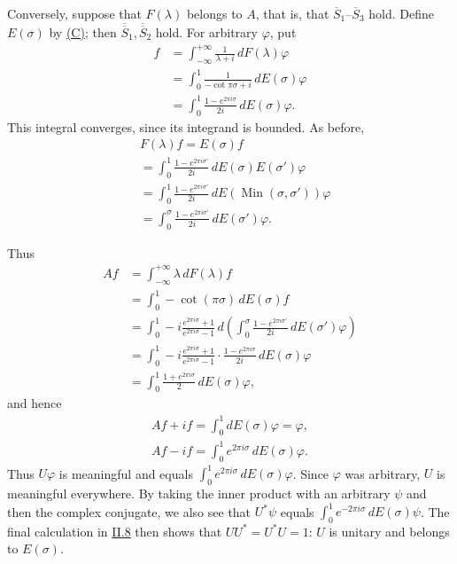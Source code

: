 \documentclass[fontsize=13pt,twoside,openany,headings=normal,parskip=false,bookmarkpackage=false,DIV=calc]{scrbook}
\begin{document}
Conversely, suppose that $F(\lambda)$ belongs to $A$, that is, that $\hyperref[cond:II.Sbar1]{\overline S_1}$--$\hyperref[cond:II.Sbar3]{\overline S_3}$ hold. Define $E(\sigma)$ by \hyperref[eq:II.9.C]{(C)}; then $\hyperref[cond:II.Sdouble1]{\overline{\overline S}_1},\hyperref[cond:II.Sdouble2]{\overline{\overline S}_2}$ hold. For arbitrary $\varphi$, put
\begin{align*}
f&=\int_{-\infty}^{+\infty}\frac1{\lambda+i}\,dF(\lambda)\varphi\\
&=\int_0^1\frac1{-\cot\pi\sigma+i}\,dE(\sigma)\varphi\\
&=\int_0^1\frac{1-e^{2\pi i\sigma}}{2i}\,dE(\sigma)\varphi.
\end{align*}
This integral converges, since its integrand is bounded. As before,
\begin{align*}
&F(\lambda)f=E(\sigma)f\\
&=\int_0^1\frac{1-e^{2\pi i\sigma'}}{2i}\,dE(\sigma)E(\sigma')\varphi\\
&=\int_0^1\frac{1-e^{2\pi i\sigma'}}{2i}\,dE(\operatorname{Min}(\sigma,\sigma'))\varphi\\
&=\int_0^\sigma\frac{1-e^{2\pi i\sigma'}}{2i}\,dE(\sigma')\varphi.
\end{align*}

\hypertarget{origpage-84}{}%
Thus
\begin{align*}
Af&=\int_{-\infty}^{+\infty}\lambda\,dF(\lambda)f\\
&=\int_0^1-\cot(\pi\sigma)\,dE(\sigma)f\\
&=\int_0^1-i\frac{e^{2\pi i\sigma}+1}{e^{2\pi i\sigma}-1}\,
d\left(\int_0^\sigma\frac{1-e^{2\pi i\sigma'}}{2i}\,dE(\sigma')\varphi\right)\\
&=\int_0^1-i\frac{e^{2\pi i\sigma}+1}{e^{2\pi i\sigma}-1}\cdot
\frac{1-e^{2\pi i\sigma}}{2i}\,dE(\sigma)\varphi\\
&=\int_0^1\frac{1+e^{2\pi i\sigma}}2\,dE(\sigma)\varphi,
\end{align*}
and hence
\begin{gather*}
Af+if=\int_0^1dE(\sigma)\varphi=\varphi,\\
Af-if=\int_0^1e^{2\pi i\sigma}\,dE(\sigma)\varphi.
\end{gather*}
Thus $U\varphi$ is meaningful and equals $\int_0^1e^{2\pi i\sigma}\,dE(\sigma)\varphi$. Since $\varphi$ was arbitrary, $U$ is meaningful everywhere. By taking the inner product with an arbitrary $\psi$ and then the complex conjugate, we also see that $U^*\psi$ equals $\int_0^1e^{-2\pi i\sigma}\,dE(\sigma)\psi$. The final calculation in \hyperref[sec:II.8]{II.8} then shows that $UU^*=U^*U=1$: $U$ is unitary and belongs to $E(\sigma)$.
\end{document}
